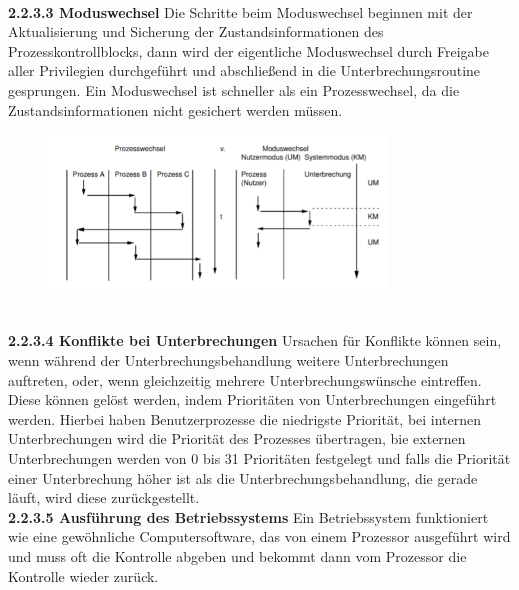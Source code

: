 \documentclass{article}
\begin{document}
    \\
    \textbf{2.2.3.3 Moduswechsel}\newline
    Die Schritte beim Moduswechsel beginnen mit der Aktualisierung und Sicherung der Zustandsinformationen des Prozesskontrollblocks, dann wird der eigentliche Moduswechsel durch Freigabe aller Privilegien durchgeführt und abschließend in die Unterbrechungsroutine gesprungen. Ein Moduswechsel ist schneller als ein Prozesswechsel, da die Zustandsinformationen nicht gesichert werden müssen.\newline
    \begin{figure}[h]
        \centering
	    \includegraphics[width=90mm]{Skizzen/3_Kapitel/Prozess_Moduswechsel.png}
    \end{figure}
    \\
    \textbf{2.2.3.4 Konflikte bei Unterbrechungen}\newline
    Ursachen für Konflikte können sein, wenn während der Unterbrechungsbehandlung weitere Unterbrechungen auftreten, oder, wenn gleichzeitig mehrere Unterbrechungswünsche eintreffen.\newline
    Diese können gelöst werden, indem Prioritäten von Unterbrechungen eingeführt werden. Hierbei haben Benutzerprozesse die niedrigste Priorität, bei internen Unterbrechungen wird die Priorität des Prozesses übertragen, bie externen Unterbrechungen werden von 0 bis 31 Prioritäten festgelegt und falls die Priorität einer Unterbrechung höher ist als die Unterbrechungsbehandlung, die gerade läuft, wird diese zurückgestellt.\newline
    \\
    \textbf{2.2.3.5 Ausführung des Betriebssystems}\newline
    Ein Betriebssystem funktioniert wie eine gewöhnliche Computersoftware, das von einem Prozessor ausgeführt wird und muss oft die Kontrolle abgeben und bekommt dann vom Prozessor die Kontrolle wieder zurück. \newline
\end{document}
